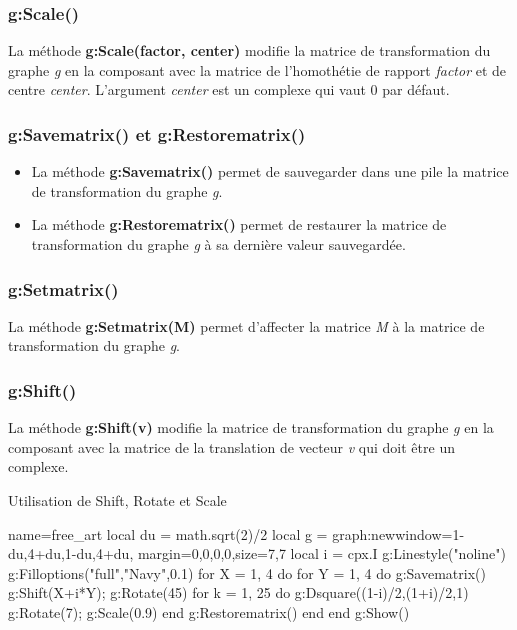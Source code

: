 \subsubsection{g:Scale()}
La méthode \textbf{g:Scale(factor, center)} modifie la matrice de transformation du graphe \emph g en la composant avec la matrice de l'homothétie de rapport \emph{factor} et de centre \emph{center}. L'argument \emph{center} est un complexe qui vaut $0$ par défaut.

\subsubsection{g:Savematrix() et g:Restorematrix()}
\begin{itemize}
    \item La méthode \textbf{g:Savematrix()} permet de sauvegarder dans une pile la matrice de transformation du graphe \emph g.
    \item La méthode \textbf{g:Restorematrix()} permet de restaurer la matrice de transformation du graphe \emph g à sa dernière valeur sauvegardée.
\end{itemize}

\subsubsection{g:Setmatrix()}
La méthode \textbf{g:Setmatrix(M)} permet d'affecter la matrice \emph M à la matrice de transformation du graphe \emph g.

\subsubsection{g:Shift()}
La méthode \textbf{g:Shift(v)} modifie la matrice de transformation du graphe \emph g en la composant avec la matrice de la translation de vecteur \emph{v} qui doit être un complexe.

\begin{demo}{Utilisation de Shift, Rotate et Scale}
\begin{luadraw}{name=free_art}
local du = math.sqrt(2)/2
local g = graph:new{window={1-du,4+du,1-du,4+du},
            margin={0,0,0,0},size={7,7}}
local i = cpx.I
g:Linestyle("noline")
g:Filloptions("full","Navy",0.1)
for X = 1, 4 do
    for Y = 1, 4 do
        g:Savematrix()
        g:Shift(X+i*Y); g:Rotate(45)
        for k = 1, 25 do
            g:Dsquare((1-i)/2,(1+i)/2,1)
            g:Rotate(7); g:Scale(0.9)
        end
        g:Restorematrix()
    end
end
g:Show()
\end{luadraw}
\end{demo}

